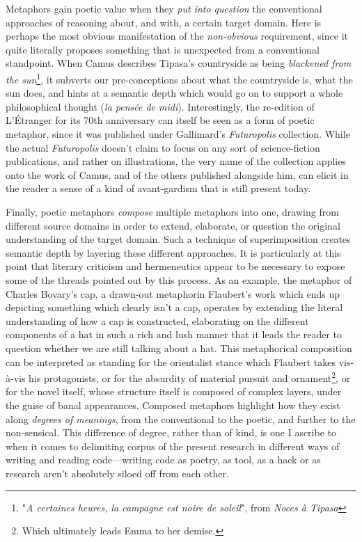 \documentclass{article}
\begin{document}
Metaphors gain poetic value when they \emph{put into question} the conventional approaches of reasoning about, and with, a certain target domain. Here is perhaps the most obvious manifestation of the \emph{non-obvious} requirement, since it quite literally proposes something that is unexpected from a conventional standpoint. When Camus describes Tipasa's countryside as being \emph{blackened from the sun}\footnote{"\emph{A certaines heures, la campagne est noire de soleil}", from \emph{Noces à Tipasa}}, it subverts our pre-conceptions about what the countryside is, what the sun does, and hints at a semantic depth which would go on to support a whole philosophical thought (\emph{la pensée de midi}). Interestingly, the re-edition of L'Étranger for its 70th anniversary can itself be seen as a form of poetic metaphor, since it was published under Gallimard's \emph{Futuropolis} collection. While the actual \emph{Futuropolis} doesn't claim to focus on any sort of science-fiction publications, and rather on illustrations, the very name of the collection applies onto the work of Camus, and of the others published alongside him, can elicit in the reader a sense of a kind of avant-gardism that is still present today.

Finally, poetic metaphors \emph{compose} multiple metaphors into one, drawing from different source domains in order to extend, elaborate, or question the original understanding of the target domain. Such a technique of superimposition creates semantic depth by layering these different approaches. It is particularly at this point that literary criticism and hermeneutics appear to be necessary to expose some of the threads pointed out by this process. As an example, the metaphor of Charles Bovary's cap, a drawn-out metaphorin Flaubert's work which ends up depicting something which clearly isn't a cap, operates by extending the literal understanding of how a cap is constructed, elaborating on the different components of a hat in such a rich and lush manner that it leads the reader to question whether we are still talking about a hat. This metaphorical composition can be interpreted as standing for the orientalist stance which Flaubert takes vis-à-vis his protagonists, or for the absurdity of material pursuit and ornament\footnote{Which ultimately leads Emma to her demise.}, or for the novel itself, whose structure itself is composed of complex layers, under the guise of banal appearances. Composed metaphors highlight how they exist along \emph{degrees of meanings}, from the conventional to the poetic, and further to the non-sensical. This difference of degree, rather than of kind, is one I ascribe to when it comes to delimiting corpus of the present research in different ways of writing and reading code—writing code as poetry, as tool, as a hack or as research aren't absolutely siloed off from each other.
\end{document}
